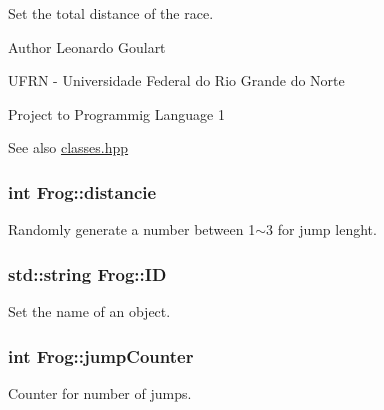 Set the total distance of the race. 

\begin{DoxyAuthor}{Author}
Leonardo Goulart 

U\+F\+RN -\/ Universidade Federal do Rio Grande do Norte 

Project to Programmig Language 1 
\end{DoxyAuthor}
\begin{DoxySeeAlso}{See also}
\hyperlink{classes_8hpp}{classes.\+hpp} 
\end{DoxySeeAlso}
\subsubsection[{\texorpdfstring{distancie}{distancie}}]{\setlength{\rightskip}{0pt plus 5cm}int Frog\+::distancie\hspace{0.3cm}{\ttfamily [private]}}\hypertarget{classFrog_acfa2696ff1e9483acfc3c60941a9a540}{}\label{classFrog_acfa2696ff1e9483acfc3c60941a9a540}


Randomly generate a number between 1$\sim$3 for jump lenght. 

\subsubsection[{\texorpdfstring{ID}{ID}}]{\setlength{\rightskip}{0pt plus 5cm}std\+::string Frog\+::\+ID\hspace{0.3cm}{\ttfamily [private]}}\hypertarget{classFrog_ac2fe938591f6471cbea049b87dbc2a2e}{}\label{classFrog_ac2fe938591f6471cbea049b87dbc2a2e}


Set the name of an object. 

\subsubsection[{\texorpdfstring{jump\+Counter}{jumpCounter}}]{\setlength{\rightskip}{0pt plus 5cm}int Frog\+::jump\+Counter\hspace{0.3cm}{\ttfamily [private]}}\hypertarget{classFrog_a3d38d6ca4384c9d2cb4b770d93cf7dd5}{}\label{classFrog_a3d38d6ca4384c9d2cb4b770d93cf7dd5}


Counter for number of jumps. 


